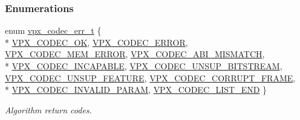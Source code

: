 \subsubsection*{Enumerations}
\begin{DoxyCompactItemize}
\item 
enum \hyperlink{group__codec_gada1084710837ad363b92f2379dd2b8d2}{vpx\+\_\+codec\+\_\+err\+\_\+t} \{ \\*
\hyperlink{group__codec_ggada1084710837ad363b92f2379dd2b8d2af1dcde74b1c5ff7b29f31246dfd90986}{V\+P\+X\+\_\+\+C\+O\+D\+E\+C\+\_\+\+O\+K}, 
\hyperlink{group__codec_ggada1084710837ad363b92f2379dd2b8d2abd8a8f9c2588adab5d764d957e265135}{V\+P\+X\+\_\+\+C\+O\+D\+E\+C\+\_\+\+E\+R\+R\+O\+R}, 
\hyperlink{group__codec_ggada1084710837ad363b92f2379dd2b8d2a96c6d2600dc0ec25c2cb798e8d2f4760}{V\+P\+X\+\_\+\+C\+O\+D\+E\+C\+\_\+\+M\+E\+M\+\_\+\+E\+R\+R\+O\+R}, 
\hyperlink{group__codec_ggada1084710837ad363b92f2379dd2b8d2afe8f723512f728bc518bbfba3b96d324}{V\+P\+X\+\_\+\+C\+O\+D\+E\+C\+\_\+\+A\+B\+I\+\_\+\+M\+I\+S\+M\+A\+T\+C\+H}, 
\\*
\hyperlink{group__codec_ggada1084710837ad363b92f2379dd2b8d2a4470784ba5a3ef84dc0697d5489dd292}{V\+P\+X\+\_\+\+C\+O\+D\+E\+C\+\_\+\+I\+N\+C\+A\+P\+A\+B\+L\+E}, 
\hyperlink{group__codec_ggada1084710837ad363b92f2379dd2b8d2afff886e57782098a3df13d4e349ca973}{V\+P\+X\+\_\+\+C\+O\+D\+E\+C\+\_\+\+U\+N\+S\+U\+P\+\_\+\+B\+I\+T\+S\+T\+R\+E\+A\+M}, 
\hyperlink{group__codec_ggada1084710837ad363b92f2379dd2b8d2a8a86701e65d826d82651537aadd6c539}{V\+P\+X\+\_\+\+C\+O\+D\+E\+C\+\_\+\+U\+N\+S\+U\+P\+\_\+\+F\+E\+A\+T\+U\+R\+E}, 
\hyperlink{group__codec_ggada1084710837ad363b92f2379dd2b8d2a29d03c009e0479dbf4ecbd8db1011b85}{V\+P\+X\+\_\+\+C\+O\+D\+E\+C\+\_\+\+C\+O\+R\+R\+U\+P\+T\+\_\+\+F\+R\+A\+M\+E}, 
\\*
\hyperlink{group__codec_ggada1084710837ad363b92f2379dd2b8d2ab5857f7b5f03f8ca164fab8843a979df}{V\+P\+X\+\_\+\+C\+O\+D\+E\+C\+\_\+\+I\+N\+V\+A\+L\+I\+D\+\_\+\+P\+A\+R\+A\+M}, 
\hyperlink{group__codec_ggada1084710837ad363b92f2379dd2b8d2a452450a5adfcc14ef8a0ac12611dae21}{V\+P\+X\+\_\+\+C\+O\+D\+E\+C\+\_\+\+L\+I\+S\+T\+\_\+\+E\+N\+D}
 \}
\begin{DoxyCompactList}\small\item\em Algorithm return codes. \end{DoxyCompactList}\end{DoxyCompactItemize}
